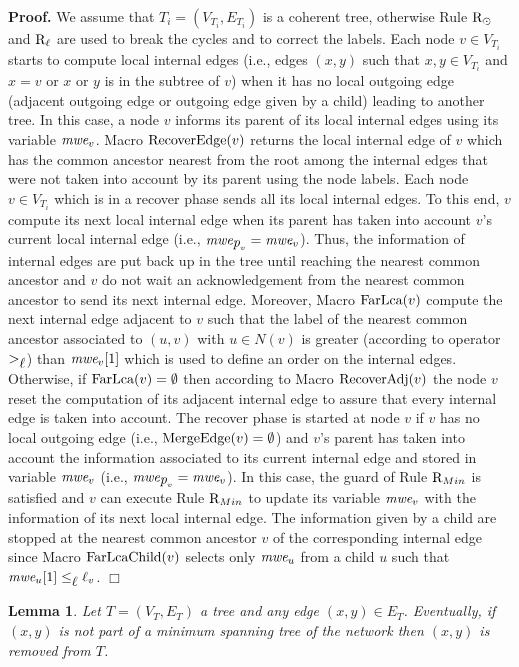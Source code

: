\documentclass[11pt,a4paper]{article}
\newtheorem{lemma}{Lemma}
\newenvironment{proof}{\noindent \begin{rm}{\textbf{Proof.} }}{\hspace*{\fill}$\Box$\par\end{rm}}
\newcommand{\parent}{\mbox{\it p}}
\newcommand{\lab}{\mbox{\rm $\ell$}}
\newcommand{\m}{\mbox{\it mwe}}
\newcommand{\FarLca}{\mbox{\rm FarLca}}
\newcommand{\FarLcaC}{\mbox{\rm FarLcaChild}}
\newcommand{\Fusion}{\mbox{\rm MergeEdge}}
\newcommand{\UA}{\mbox{\rm RecoverAdj}}
\newcommand{\Update}{\mbox{\rm RecoverEdge}}
\newcommand{\RRoot}{\mbox{\rm R$_{\odot}$}} 	\newcommand{\RRLC}{\mbox{\rm R$_{\ell_{\odot}}$}}\newcommand{\RLC}{\mbox{\rm R$_{\ell}$}} \newcommand{\RMin}{\mbox{\rm R$_{Min}$}}
\begin{document}
\begin{proof}
We assume that $T_i=(V_{T_i},E_{T_i})$ is a coherent tree, otherwise Rule $\RRoot$ and $\RLC$ are used to break the cycles and to correct the labels. Each node $v \in V_{T_i}$ starts to compute local internal edges (i.e., edges $(x,y)$ such that $x,y \in V_{T_i}$ and $x=v$ or $x$ or $y$ is in the subtree of $v$) when it has no local outgoing edge (adjacent outgoing edge or outgoing edge given by a child) leading to another tree. In this case, a node $v$ informs its parent of its local internal edges using its variable $\m_v$. Macro $\Update(v)$ returns the local internal edge of $v$ which has the common ancestor nearest from the root among the internal edges that were not taken into account by its parent using the node labels. Each node $v \in V_{T_i}$ which is in a recover phase sends all its local internal edges. To this end, $v$ compute its next local internal edge when its parent has taken into account $v$'s current local internal edge (i.e., $\m_{\parent_v}=\m_v$). Thus, the information of internal edges are put back up in the tree until reaching the nearest common ancestor and $v$ do not wait an acknowledgement from the nearest common ancestor to send its next internal edge. Moreover, Macro $\FarLca(v)$ compute the next internal edge adjacent to $v$ such that the label of the nearest common ancestor associated to $(u,v)$ with $u \in N(v)$ is greater (according to operator $>_{\lab}$) than $\m_v[1]$ which is used to define an order on the internal edges. Otherwise, if $\FarLca(v)=\emptyset$ then according to Macro $\UA(v)$ the node $v$ reset the computation of its adjacent internal edge to assure that every internal edge is taken into account. The recover phase is started at node $v$ if $v$ has no local outgoing edge (i.e., $\Fusion(v)=\emptyset$) and $v$'s parent has taken into account the information associated to its current internal edge and stored in variable $\m_v$ (i.e., $\m_{\parent_v}=\m_v$). In this case, the guard of Rule $\RMin$ is satisfied and $v$ can execute Rule $\RMin$ to update its variable $\m_v$ with the information of its next local internal edge. The information given by a child are stopped at the nearest common ancestor $v$ of the corresponding internal edge since Macro $\FarLcaC(v)$ selects only $\m_u$ from a child $u$ such that $\m_u[1] \leq_{\lab} \lab_v$.
\end{proof}

\begin{lemma}
\label{lem:mst_correction}
Let $T=(V_T,E_T)$ a tree and any edge $(x,y) \in E_T$. Eventually, if $(x,y)$ is not part of a minimum spanning tree of the network then $(x,y)$ is removed from $T$.
\end{lemma}
\end{document}
